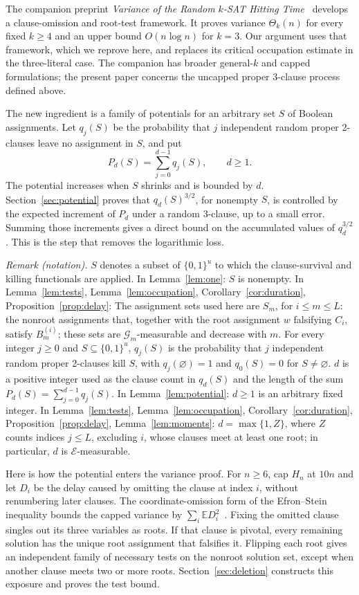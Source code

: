 \documentclass[11pt]{article}
\theoremstyle{remark}
\newcommand{\E}{\mathbb E}
\newcommand{\cE}{\mathcal E}
\newcommand{\cG}{\mathcal G}
\numberwithin{equation}{section}
\begin{document}
The companion preprint \emph{Variance of the Random $k$-SAT Hitting
Time}~\cite{OpenAI2026Variance} develops a clause-omission and root-test
framework. It proves variance $\Theta_k(n)$ for every fixed $k\ge4$
and an upper bound $O(n\log n)$ for $k=3$. Our argument uses that
framework, which we reprove here, and replaces its critical occupation
estimate in the three-literal case. The companion has broader general-$k$
and capped formulations; the present paper concerns the uncapped proper
3-clause process defined above.

The new ingredient is a family of potentials for an arbitrary set $S$ of
Boolean assignments. Let $q_j(S)$ be the probability that $j$ independent
random proper 2-clauses leave no assignment in $S$, and put
\[
 P_d(S)=\sum_{j=0}^{d-1}q_j(S),\qquad d\ge1.
\]
The potential increases when $S$ shrinks and is bounded by $d$.
Section~\ref{sec:potential} proves that $q_d(S)^{3/2}$, for nonempty $S$,
is controlled by the expected increment of $P_d$ under a random
3-clause, up to a small error. Summing those increments gives a direct
bound on the accumulated values of $q_d^{3/2}$. This is the step that
removes the logarithmic loss.

\noindent\textit{Remark (notation).} $S$ denotes a subset of $\{0,1\}^u$ to which the clause-survival and killing functionals are applied. In Lemma~\ref{lem:one}: $S$ is nonempty. In Lemma~\ref{lem:tests}, Lemma~\ref{lem:occupation}, Corollary~\ref{cor:duration}, Proposition~\ref{prop:delay}: The assignment sets used here are $S_m$, for $i\le m\le L$: the nonroot assignments that, together with the root assignment $w$ falsifying $C_i$, satisfy $B_m^{(i)}$; these sets are $\cG_m$-measurable and decrease with $m$. For every integer $j\ge0$ and $S\subseteq\{0,1\}^u$, $q_j(S)$ is the probability that $j$ independent random proper 2-clauses kill $S$, with $q_j(\varnothing)=1$ and $q_0(S)=0$ for $S\ne\varnothing$. $d$ is a positive integer used as the clause count in $q_d(S)$ and the length of the sum $P_d(S)=\sum_{j=0}^{d-1}q_j(S)$. In Lemma~\ref{lem:potential}: $d\ge1$ is an arbitrary fixed integer. In Lemma~\ref{lem:tests}, Lemma~\ref{lem:occupation}, Corollary~\ref{cor:duration}, Proposition~\ref{prop:delay}, Lemma~\ref{lem:moments}: $d=\max\{1,Z\}$, where $Z$ counts indices $j\le L$, excluding $i$, whose clauses meet at least one root; in particular, $d$ is $\cE$-measurable.


Here is how the potential enters the variance proof. For $n\ge6$, cap $H_n$ at $10n$
and let $D_i$ be the delay caused by omitting the clause at index $i$,
without renumbering later clauses. The coordinate-omission form of the
Efron--Stein inequality bounds the capped variance by
$\sum_i\E D_i^2$~\cite{EfronStein1981,BBLM2005}. Fixing the omitted clause
singles out its three variables as roots. If that clause is pivotal,
every remaining solution has the unique root assignment that falsifies it.
Flipping each root gives an independent family of necessary tests on the
nonroot solution set, except when another clause meets two or more roots.
Section~\ref{sec:deletion} constructs this exposure and proves the test bound.
\end{document}
